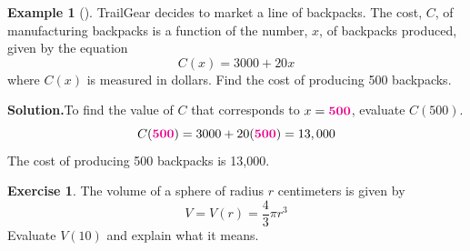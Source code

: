 \documentclass[10pt,]{book}
\theoremstyle{plain}
\theoremstyle{definition}
\theoremstyle{definition}
\newtheorem{example}[theorem]{Example}
\theoremstyle{definition}
\newtheorem{exercise}[theorem]{Exercise}
\newcommand{\alert}[1]{\boldsymbol{\color{magenta}{#1}}}
\begin{document}
\begin{example}[]\label{example-function-notation-abuse}
TrailGear decides to market a line of backpacks. The cost, \(C\), of manufacturing backpacks is a function of the number, \(x\), of backpacks produced, given by the equation%
\begin{equation*}
C(x) = 3000 + 20x
\end{equation*}
where \(C(x)\) is measured in dollars. Find the cost of producing 500 backpacks.%
\par\medskip\noindent%
\textbf{Solution.}\quad To find the value of \(C\) that corresponds to \(x = \alert{500}\), evaluate \(C(500)\).%
\begin{equation*}
C(\alert{500}) = 3000 + 20(\alert{500}) = 13,000
\end{equation*}
The cost of producing 500 backpacks is \textdollar{}13,000.%
\end{example}
\begin{exercise}\label{exercise-sphere-volume}
The volume of a sphere of radius \(r\) centimeters is given by%
\begin{equation*}
V = V(r) = \frac{4}{3}\pi r^3
\end{equation*}
Evaluate \(V(10)\) and explain what it means.%
\end{exercise}
\typeout{************************************************}
\typeout{************************************************}
\end{document}
